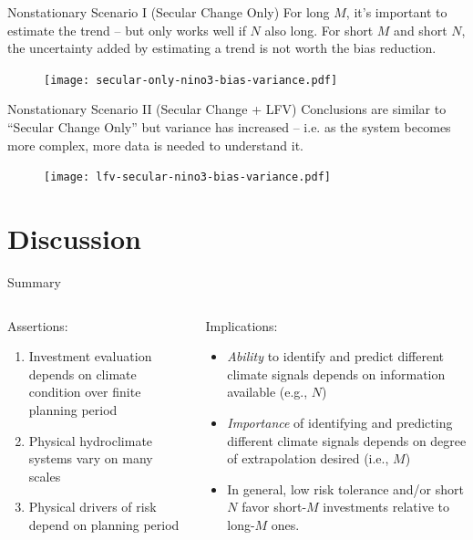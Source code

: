 \documentclass[
  10pt,     %
]{beamer}
\makeatletter
\newcommand*{\eg}{e.g.\@\xspace}
\newcommand*{\ie}{i.e.\@\xspace}
\makeatother
\begin{document}
\begin{frame}{Nonstationary Scenario I (Secular Change Only)}
  For long $M$, it's important to estimate the trend -- but only works well if $N$ also long.
  For short $M$ and short $N$, the uncertainty added by estimating a trend is not worth the bias reduction.
  \begin{figure}
    \centering
    \texttt{[image: secular-only-nino3-bias-variance.pdf]}
  \end{figure}
\end{frame}

\begin{frame}{Nonstationary Scenario II (Secular Change + LFV)}
  Conclusions are similar to ``Secular Change Only'' but variance has increased -- \ie as the system becomes more complex, more data is needed to understand it.
  \begin{figure}
    \centering
    \texttt{[image: lfv-secular-nino3-bias-variance.pdf]}
  \end{figure}
\end{frame}

\section{Discussion}

\begin{frame}{Summary}
  \begin{columns}[T]
    \begin{column}{0.5\textwidth}
      Assertions:
      \begin{enumerate}
        \item Investment evaluation depends on climate condition over finite planning period
        \item Physical hydroclimate systems vary on many scales
        \item Physical drivers of risk depend on planning period
      \end{enumerate}    
    \end{column}
    \pause
    \begin{column}{0.5\textwidth}
      Implications:
      \begin{itemize}
        \pause
        \item \emph{Ability} to identify and predict different climate signals depends on information available (\eg, $N$)
        \pause
        \item \emph{Importance} of identifying and predicting different climate signals depends on degree of extrapolation desired (\ie, $M$)
        \pause
        \item In general, low risk tolerance and/or short $N$ favor short-$M$ investments relative to long-$M$ ones.
      \end{itemize}    
    \end{column}
  \end{columns}
\end{frame}
\end{document}
